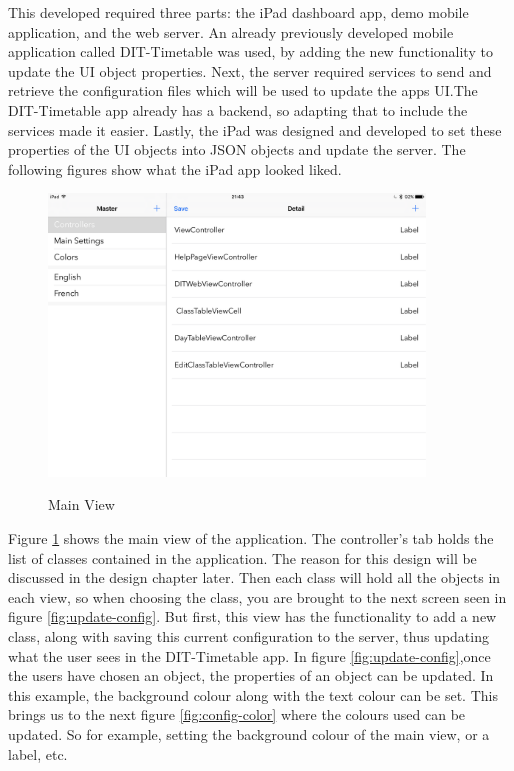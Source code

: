 This developed required three parts: the iPad dashboard app, demo mobile application, and the web server. An already previously developed mobile application called DIT-Timetable was used, by adding the new functionality to update the UI object properties. Next, the server required services to send and retrieve the configuration files which will be used to update the apps UI.The DIT-Timetable app already has a backend, so adapting that to include the services made it easier. Lastly, the iPad was designed and developed to set these properties of the UI objects into JSON objects and update the server. The following figures show what the iPad app looked liked.

\begin{figure}[!h]
    \caption{Main View}
    \centering
    \includegraphics[width=100mm]{images/ipad-images/mainview}
    \label{fig:mainview}
\end{figure}

Figure \ref{fig:mainview} shows the main view of the application. The controller's tab holds the list of classes contained in the application. The reason for this design will be discussed in the design chapter later. Then each class will hold all the objects in each view, so when choosing the class, you are brought to the next screen seen in figure \ref{fig:update-config}. But first, this view has the functionality to add a new class, along with saving this current configuration to the server, thus updating what the user sees in the DIT-Timetable app. In figure \ref{fig:update-config},once the users have chosen an object, the properties of an object can be updated. In this example, the background colour along with the text colour can be set. This brings us to the next figure \ref{fig:config-color} where the colours used can be updated. So for example, setting the background colour of the main view, or a label, etc.

